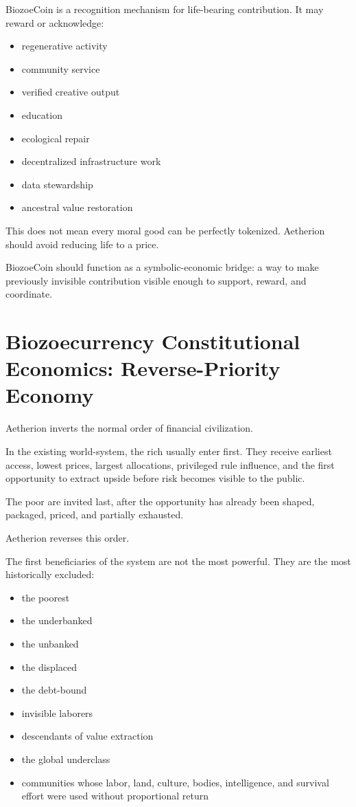 ﻿\documentclass[12pt]{article}
\begin{document}
BiozoeCoin is a recognition mechanism for life-bearing contribution. It may reward or acknowledge:

\begin{itemize}
  \item regenerative activity
  \item community service
  \item verified creative output
  \item education
  \item ecological repair
  \item decentralized infrastructure work
  \item data stewardship
  \item ancestral value restoration
\end{itemize}

This does not mean every moral good can be perfectly tokenized. Aetherion should avoid reducing life to a price.

BiozoeCoin should function as a symbolic-economic bridge: a way to make previously invisible contribution visible enough to support, reward, and coordinate.

\section{Biozoecurrency Constitutional Economics: Reverse-Priority Economy}


Aetherion inverts the normal order of financial civilization.

In the existing world-system, the rich usually enter first. They receive earliest access, lowest prices, largest allocations, privileged rule influence, and the first opportunity to extract upside before risk becomes visible to the public.

The poor are invited last, after the opportunity has already been shaped, packaged, priced, and partially exhausted.

Aetherion reverses this order.

The first beneficiaries of the system are not the most powerful. They are the most historically excluded:

\begin{itemize}
  \item the poorest
  \item the underbanked
  \item the unbanked
  \item the displaced
  \item the debt-bound
  \item invisible laborers
  \item descendants of value extraction
  \item the global underclass
  \item communities whose labor, land, culture, bodies, intelligence, and survival effort were used without proportional return
\end{itemize}
\end{document}
